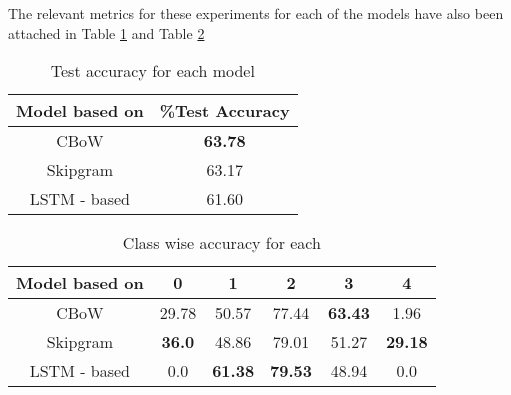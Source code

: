 \documentclass{article}
\begin{document}
\newpage
\noindent
The relevant metrics for these experiments for each of the models have also been attached in Table \ref{tab:results_q1} and Table \ref{tab:classwise_results_1}

\begin{table}[h!]
\begin{center}
\begin{tabular}{ |c|c||} 
 \hline
Model based on & \%Test Accuracy\\ 
 \hline \hline
CBoW & \textbf{63.78}\\ 
 \hline
Skipgram & 63.17  \\ 
\hline
LSTM - based & 61.60 \\
\hline
\end{tabular}
\caption{Test accuracy for each model }
\label{tab:results_q1}
\end{center}
\end{table}

\vspace{-2.0em}

\begin{table}[h!]
\begin{center}
\begin{tabular}{ |c|c|c|c|c|c|} 
 \hline
Model based on  & 0 & 1 & 2 & 3 & 4\\ 
 \hline \hline
CBoW & 29.78  & 50.57  & 77.44  &\textbf{ 63.43}  & 1.96  \\
 \hline
Skipgram &  \textbf{36.0}  & 48.86  & 79.01  & 51.27  & \textbf{29.18} \\ 
\hline
LSTM - based & 0.0  & \textbf{61.38 } & \textbf{79.53}  & 48.94  & 0.0  \\
\hline
\hline
\end{tabular}
\caption{Class wise accuracy for each }
\label{tab:classwise_results_1}
\end{center}
\end{table}
\vspace{-3.0em}
\end{document}
